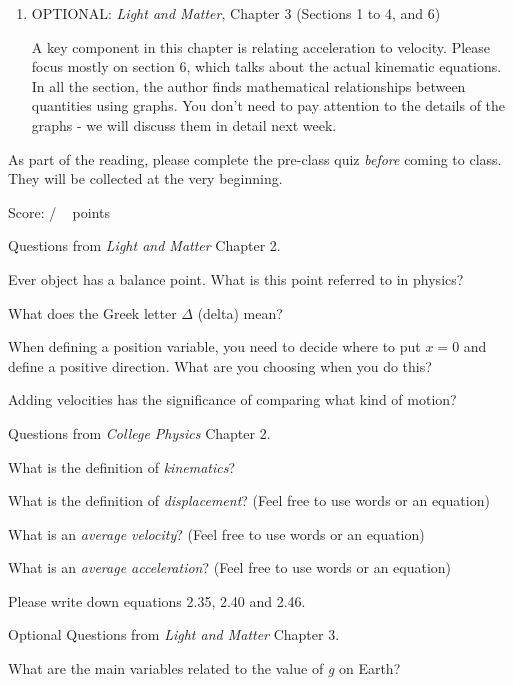 \documentclass[addpoints,12pt]{exam}
\begin{document}
\begin{enumerate}
	\item OPTIONAL: \textit{Light and Matter}, Chapter 3 (Sections 1 to 4, and 6)
	
	A key component in this chapter is relating acceleration to velocity. Please focus mostly on section 6, which talks about the actual kinematic equations. In all the section, the author finds mathematical relationships between quantities using graphs. You don't need to pay attention to the details of the graphs - we will discuss them in detail next week.
	
\end{enumerate}

As part of the reading, please complete the pre-class quiz \textit{before} coming to class. They will be collected at the very beginning.
 
\clearpage

\begin{flushright}
Score: \hspace{0.2in} / \numpoints ~ points
\end{flushright}

\noindent Questions from \textit{Light and Matter} Chapter 2.

\begin{questions}

\question[1]
Ever object has a balance point. What is this point referred to in physics?
\fillwithlines{0.5in}

\question[1]
What does the Greek letter $\Delta$ (delta) mean?
\fillwithlines{0.5in}

\question[1]
When defining a position variable, you need to decide where to put $x=0$ and define a positive direction. What are you choosing when you do this?
\fillwithlines{0.5in}

\question[1]
Adding velocities has the significance of comparing what kind of motion?
\fillwithlines{0.5in}
\end{questions}

\noindent Questions from \textit{College Physics} Chapter 2.

\begin{questions}
\question[1]
What is the definition of \textit{kinematics}?
\fillwithlines{0.5in}

\question[1]
What is the definition of \textit{displacement}? (Feel free to use words or an equation)
\fillwithlines{0.5in}

\question[1]
What is an \textit{average velocity}? (Feel free to use words or an equation)
\fillwithlines{0.5in}

\question[1]
What is an \textit{average acceleration}? (Feel free to use words or an equation)
\fillwithlines{0.5in}

\question[2]
Please write down equations 2.35, 2.40 and 2.46.
\fillwithlines{0.75in}

\end{questions}

\clearpage

\noindent Optional Questions from \textit{Light and Matter} Chapter 3.

\begin{questions}
\bonusquestion[1]
What are the main variables related to the value of \textit{g} on Earth?
\fillwithlines{0.5in}

\end{questions}
\end{document}
